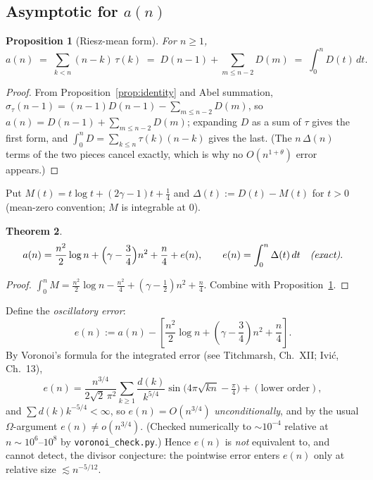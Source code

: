 \documentclass[12pt]{article}
\newtheorem{theorem}{Theorem}
\newtheorem{proposition}[theorem]{Proposition}
\theoremstyle{definition}
\begin{document}
\subsection{Asymptotic for \texorpdfstring{$a(n)$}{a(n)}}

\begin{proposition}[Riesz-mean form]
\label{prop:riesz}
For $n\ge 1$,
\[
    a(n)\;=\;\sum_{k<n}(n-k)\,\tau(k)\;=\;D(n-1)+\sum_{m\le n-2}D(m)\;=\;\int_0^n D(t)\,dt .
\]
\end{proposition}
\begin{proof}
From Proposition~\ref{prop:identity} and Abel summation,
$\sigma_\tau(n-1)=(n-1)D(n-1)-\sum_{m\le n-2}D(m)$, so
$a(n)=D(n-1)+\sum_{m\le n-2}D(m)$; expanding $D$ as a sum of $\tau$ gives the first form,
and $\int_0^n D=\sum_{k\le n}\tau(k)(n-k)$ gives the last.  (The $n\,\Delta(n)$ terms of the
two pieces cancel exactly, which is why no $O(n^{1+\theta})$ error appears.)
\end{proof}

Put $M(t)=t\log t+(2\gamma-1)t+\tfrac14$ and $\Delta(t):=D(t)-M(t)$ for $t>0$
(mean-zero convention; $M$ is integrable at $0$).

\begin{theorem}
\label{thm:aasym}
\[
    a(n)=\frac{n^2}{2}\log n+\Bigl(\gamma-\frac34\Bigr)n^2+\frac n4+e(n),
    \qquad e(n)=\int_0^n\Delta(t)\,dt\quad\text{\emph{(exact)}}.
\]
\end{theorem}
\begin{proof}
$\int_0^n M=\frac{n^2}{2}\log n-\frac{n^2}{4}+(\gamma-\frac12)n^2+\frac n4$.
Combine with Proposition~\ref{prop:riesz}.
\end{proof}

Define the \emph{oscillatory error}:
\begin{equation}
    e(n) := a(n) - \left[\frac{n^2}{2}\log n
        + \left(\gamma-\frac{3}{4}\right)n^2 + \frac{n}{4}\right].
    \label{eq:err}
\end{equation}
By Voronoi's formula for the integrated error (see Titchmarsh, Ch.~XII; Ivi\'c, Ch.~13),
\[
    e(n)=\frac{n^{3/4}}{2\sqrt2\,\pi^2}\sum_{k\ge1}\frac{d(k)}{k^{5/4}}
         \sin\!\bigl(4\pi\sqrt{kn}-\tfrac{\pi}{4}\bigr)+(\text{lower order}),
\]
and $\sum d(k)k^{-5/4}<\infty$, so $e(n)=O(n^{3/4})$ \emph{unconditionally}, and by the usual
$\Omega$-argument $e(n)\ne o(n^{3/4})$.  (Checked numerically to $\sim10^{-4}$ relative
at $n\sim10^{6}$--$10^{8}$ by \texttt{voronoi\_check.py}.)  Hence $e(n)$ is \emph{not}
equivalent to, and cannot detect, the divisor conjecture: the pointwise error enters $e(n)$
only at relative size $\lesssim n^{-5/12}$.
\end{document}
